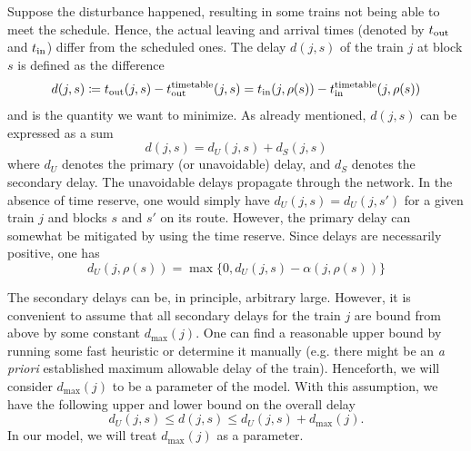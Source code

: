 Suppose the disturbance happened, resulting in some trains not being able to meet the schedule.
Hence, the actual leaving and arrival times (denoted by $t_\text{out}$ and $t_\text{in}$) differ from the
scheduled ones. The delay $d(j, s)$ of the train $j$ at block $s$ is defined as the difference
\begin{equation}
	\label{eq:djs}
	d(j, s) \coloneqq t_\text{out}(j, s) - t_\text{out}^\text{timetable}(j, s) = t_\text{in}(j, \rho(s)) - t_\text{in}^\text{timetable}(j, \rho(s))
\end{equation}
and is the quantity we want to minimize. As already mentioned, $d(j, s)$ can be expressed as a sum
\begin{equation}
	d(j, s) = d_U(j, s) + d_S(j, s)
\end{equation}
where $d_U$ denotes the primary (or unavoidable) delay, and $d_S$ denotes the secondary delay. The
unavoidable delays propagate through the network. In the absence of time reserve, one would simply
have $d_U(j, s) = d_U(j, s')$ for a given train $j$ and blocks $s$ and $s'$ on its route. However,
the primary delay can somewhat be mitigated by using the time reserve. Since delays are necessarily
positive, one has
\begin{equation}
	d_U(j, \rho(s)) = \max\{0, d_U(j, s) - \alpha(j, \rho(s))\}
\end{equation}

The secondary delays can be, in principle, arbitrary large. However, it is convenient to assume that
all secondary delays for the train $j$ are bound from above by some constant $d_{\max}(j)$. One can find
a reasonable upper bound by running some fast heuristic or determine it manually (e.g. there might
be an \emph{a priori} established maximum allowable delay of the train). Henceforth, we will consider
$d_{\max}(j)$ to be a parameter of the model. With this assumption, we have the following upper and
lower bound on the overall delay
\begin{equation}
	d_U(j, s) \le d(j, s) \le d_U(j, s) + d_{\max}(j).
\end{equation}
In our model, we will treat $d_{\max}(j)$ as a parameter.

